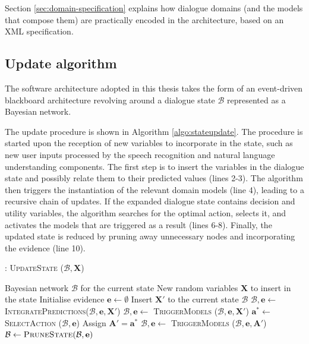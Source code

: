 Section \ref{sec:domain-specification} explains how dialogue domains (and the models that compose them) are practically encoded in the \opendial{} architecture, based on an XML specification. 

\subsection{Update algorithm} 

The software architecture adopted in this thesis takes the form of an event-driven blackboard architecture revolving around a dialogue state $\mathcal{B}$ represented as a Bayesian network.  %

The update procedure is shown in Algorithm \ref{algo:stateupdate}. The procedure is started upon the reception of new variables to incorporate in the state, such as new user inputs processed by the speech recognition and natural language understanding components. The first step is to insert the variables in the dialogue state and possibly relate them to their predicted values (lines 2-3). The algorithm then triggers the instantiation of the relevant domain models (line 4), leading to a recursive chain of updates.  If the expanded dialogue state contains decision and utility variables, the algorithm searches for the optimal action, selects it, and activates the models that are triggered as a result  (lines 6-8). Finally, the updated state is reduced by pruning away unnecessary nodes and incorporating the evidence (line 10). 


\begin{algorithm}[h]
\caption{: \textsc{UpdateState} ($\mathcal{B}, \mathbf{X}$)}
\begin{algorithmic}[1] \vspace{1mm}
\REQUIRE Bayesian network $\mathcal{B}$ for the current state
\REQUIRE New random variables $\mathbf{X}$ to insert in the state \vspace{1mm}
\STATE Initialise evidence $\mathbf{e} \leftarrow \emptyset$
\STATE Insert $\mathbf{X}'$ to the current state $\mathcal{B}$ 
\STATE $\mathcal{B}, \mathbf{e} \leftarrow $ \textsc{IntegratePredictions}($\mathcal{B}, \mathbf{e}, \mathbf{X}'$)
\STATE $\mathcal{B}, \mathbf{e} \leftarrow$ \textsc{TriggerModels} ($\mathcal{B}, \mathbf{e},  \mathbf{X}'$) \vspace{1mm}
\STATE $\mathbf{a}^* \leftarrow $ \textsc{SelectAction} ($\mathcal{B}, \mathbf{e}$)
\STATE Assign $\mathbf{A}' = \mathbf{a}^*$
\STATE $\mathcal{B}, \mathbf{e} \leftarrow$ \textsc{TriggerModels} ($\mathcal{B}, \mathbf{e}, \mathbf{A}'$)
\ENDWHILE \vspace{1mm}
\STATE $\mathcal{B} \leftarrow \textsc{PruneState} (\mathcal{B}, \mathbf{e})$ \vspace{1mm}
\end{algorithmic}
\label{algo:stateupdate}
\end{algorithm}


